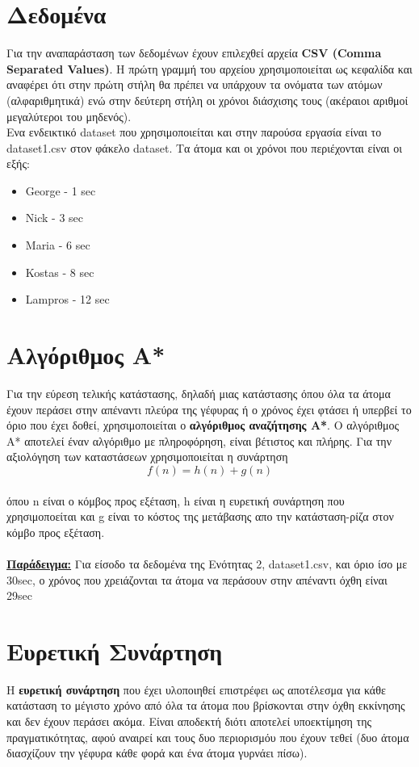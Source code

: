 \documentclass[12pt]{article}
\begin{document}
\section{Δεδομένα}
Για την αναπαράσταση των δεδομένων έχουν επιλεχθεί αρχεία \textbf{CSV (Comma Separated Values)}. Η πρώτη γραμμή του αρχείου χρησιμοποιείται ως κεφαλίδα και αναφέρει ότι στην πρώτη στήλη θα πρέπει να υπάρχουν τα ονόματα των ατόμων (αλφαριθμητικά) ενώ στην δεύτερη στήλη οι χρόνοι διάσχισης τους (ακέραιοι αριθμοί μεγαλύτεροι του μηδενός).\\
Ενα ενδεικτικό dataset που χρησιμοποιείται και στην παρούσα εργασία είναι το dataset1.csv στον φάκελο dataset. Τα άτομα και οι χρόνοι που περιέχονται είναι οι εξής:
\begin{itemize}
    \item George - 1 sec
    \item Nick - 3 sec
    \item Maria - 6 sec
    \item Kostas - 8 sec
    \item Lampros - 12 sec
\end{itemize}
\section{Αλγόριθμος A*}
Για την εύρεση τελικής κατάστασης, δηλαδή μιας κατάστασης όπου όλα τα άτομα έχουν περάσει στην απέναντι πλεύρα της γέφυρας ή ο χρόνος έχει φτάσει ή υπερβεί το όριο που έχει δοθεί, χρησιμοποιείται ο \textbf{αλγόριθμος αναζήτησης A*}. Ο αλγόριθμος Α* αποτελεί έναν αλγόριθμο με πληροφόρηση, είναι βέτιστος και πλήρης. Για την αξιολόγηση των καταστάσεων χρησιμοποιείται η συνάρτηση
 \begin{equation*}
        f(n) = h(n) + g(n)
\end{equation*}\\
όπου n είναι ο κόμβος προς εξέταση, h είναι η ευρετική συνάρτηση που χρησιμοποείται και g είναι το κόστος της μετάβασης απο την κατάσταση-ρίζα στον κόμβο προς εξέταση.\\\\
\textbf{\underline{Παράδειγμα:}} Για είσοδο τα δεδομένα της Ενότητας 2, dataset1.csv, και όριο ίσο με 30sec, ο χρόνος που χρειάζονται τα άτομα να περάσουν στην απέναντι όχθη είναι 29sec
\section{Ευρετική Συνάρτηση}
Η \textbf{ευρετική συνάρτηση} που έχει υλοποιηθεί επιστρέφει ως αποτέλεσμα για κάθε κατάσταση το μέγιστο χρόνο από όλα τα άτομα που βρίσκονται στην όχθη εκκίνησης και δεν έχουν περάσει ακόμα. Είναι αποδεκτή διότι αποτελεί υποεκτίμηση της πραγματικότητας, αφού αναιρεί και τους δυο περιορισμόυ που έχουν τεθεί (δυο άτομα διασχίζουν την γέφυρα κάθε φορά και ένα άτομα γυρνάει πίσω).
\end{document}
